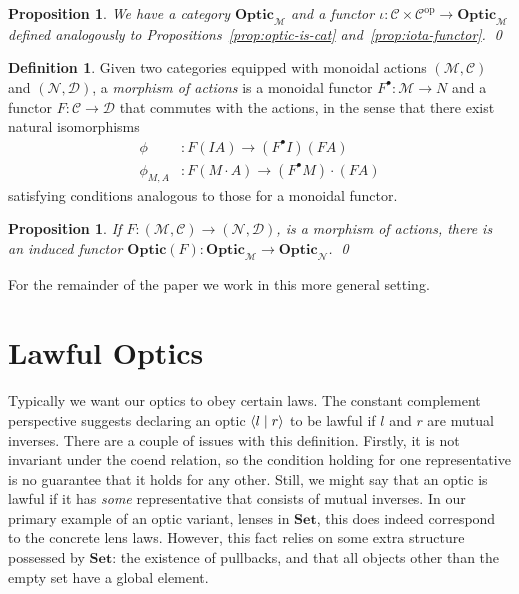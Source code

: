 \documentclass[11pt,letterpaper]{article}
\theoremstyle{plain}
\newtheorem{proposition}[theorem]{Proposition}
\theoremstyle{definition}
\newtheorem{definition}[theorem]{Definition}
\newcommand{\C}{\mathscr{C}}
\newcommand{\D}{\mathscr{D}}
\newcommand{\M}{\mathscr{M}}
\newcommand{\N}{\mathscr{N}}
\newcommand{\Set}{\mathbf{Set}}
\newcommand{\Optic}{\mathbf{Optic}}
\newcommand{\op}{\mathrm{op}}
\newcommand{\act}{\cdot}
\newcommand{\rep}[2]{{\ensuremath \left\langle #1 \mid #2 \right\rangle}}
\newcommand{\todo}[1]{\textcolor{red}{\small #1}}
\begin{document}
\begin{proposition}
  We have a category $\Optic_\M$ and a functor $\iota : \C \times \C^\op \to \Optic_\M$ defined analogously to Propositions~\ref{prop:optic-is-cat} and~\ref{prop:iota-functor}. \qed
\end{proposition}

\begin{definition}
Given two categories equipped with monoidal actions $(\M, \C)$ and $(\N, \D)$, a \emph{morphism of actions} is a monoidal functor $F^\bullet : \M \to N$ and a functor $F : \C \to \D$ that commutes with the actions, in the sense that there exist natural isomorphisms
  \begin{align*}
  \phi &: F(I A) \to (F^\bullet I)(FA) \\
  \phi_{M,A} &: F(M \act A) \to (F^\bullet M) \act (F A)
  \end{align*}
satisfying conditions analogous to those for a monoidal functor.

\end{definition}

\begin{proposition}\label{prop:change-of-action}
If $F : (\M, \C) \to (\N, \D)$, is a morphism of actions, there is an induced functor $\Optic(F) : \Optic_\M \to \Optic_\N$. \qed
\end{proposition}

For the remainder of the paper we work in this more general setting. 

\section{Lawful Optics}\label{sec:lawful-optics}
Typically we want our optics to obey certain laws. The constant complement perspective suggests declaring an optic $\rep{l}{r}$ to be lawful if $l$ and $r$ are mutual inverses. There are a couple of issues with this definition. Firstly, it is not invariant under the coend relation, so the condition holding for one representative is no guarantee that it holds for any other. Still, we might say that an optic is lawful if it has \emph{some} representative that consists of mutual inverses. In our primary example of an optic variant, lenses in $\Set$, this does indeed correspond to the concrete lens laws. However, this fact relies on some extra structure possessed by $\Set$: the existence of pullbacks, and that all objects other than the empty set have a global element.
\end{document}
